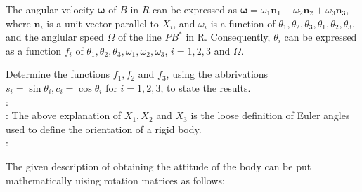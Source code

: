 The angular velocity $\pmb \omega$ of $B$ in $R$ can be expressed as $\pmb \omega = \omega_1 \pmb n_1 + \omega_2 \pmb n_2 + \omega_3 \pmb n_3$, where $\pmb n_i$ is a unit vector parallel to $X_i$, and $\omega_i$ is a function of $\theta_1, \theta_2, \theta_3, \dot \theta_1, \dot \theta_2, \dot \theta_3$, and the anglular speed $\Omega$ of the line $PB^*$ in R. Consequently, $\dot \theta_i$ can be expressed as a function $f_i$ of $\theta_1, \theta_2, \theta_3, \omega_1, \omega_2, \omega_3$, $i = 1,2,3$ and $\Omega$.

Determine the functions $f_1, f_2$ and $f_3$, using the abbrivations $s_i = \sin \theta_i, c_i = \cos \theta_i$ for $i = 1,2,3$, to state the results.\\

:\\

: The above explanation of $X_1, X_2$ and $X_3$ is the loose definition of Euler angles used to define the orientation of a rigid body.\\

:

The given description of obtaining the attitude of the body can be put mathematically uising rotation matrices as follows:

